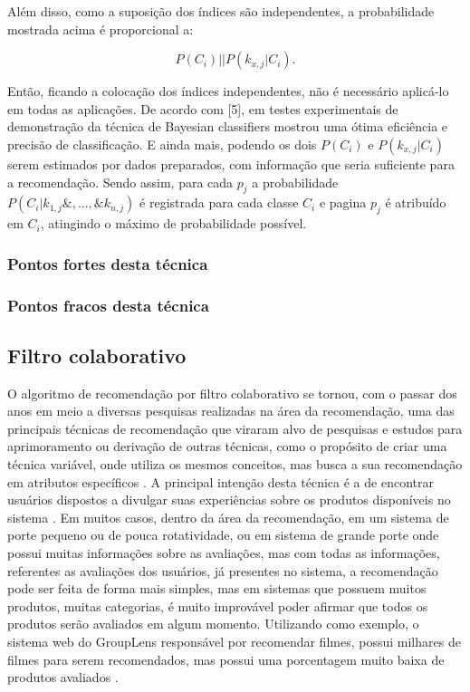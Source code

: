 \documentclass[12pt,
				openright,
				twoside,
				a4paper,
				apter=TITLE,
				section=TITLE,
				subsection=TITLE,
				chapter=TITLE,
				english,
				brazil]{abntex2}
\begin{document}
\begin{equation}
\end{equation}


Além disso, como a suposição dos índices são independentes, a probabilidade mostrada acima é 
proporcional a:

\begin{equation}
P(C_i)||P(k_{x,j}|C_i).
\end{equation}

Então, ficando a colocação dos índices independentes, não é necessário aplicá-lo em todas as aplicações. De acordo com [5], em testes experimentais de demonstração da técnica de Bayesian classifiers mostrou uma ótima eficiência e precisão de classificação. E ainda mais, podendo os dois $P(C_i)$ e $P(k_{x,j}|C_i)$ serem estimados por dados preparados, com informação que seria suficiente para a recomendação. Sendo assim, para cada $p_j$ a probabilidade $P(C_i| k_{1,j}\&,...,\&k_{n,j})$ é registrada para cada classe $C_i$ e pagina $p_j$ é atribuído em $C_i$, atingindo o máximo de probabilidade possível.

\subsubsection{Pontos fortes desta técnica}

\subsubsection{Pontos fracos desta técnica}

\subsection{Filtro colaborativo}
O algoritmo de recomendação por filtro colaborativo se tornou, com o passar dos anos em meio a diversas pesquisas realizadas na área da recomendação, uma das principais técnicas de recomendação que viraram alvo de pesquisas e estudos para aprimoramento ou derivação de outras técnicas, como o propósito de criar uma técnica variável, onde utiliza os mesmos conceitos, mas busca a sua recomendação em atributos específicos \cite{asanov2011algorithms}. A principal intenção desta técnica é a de encontrar usuários dispostos a divulgar suas experiências sobre os produtos disponíveis no sistema \cite{linden2003amazon}. Em muitos casos, dentro da área da recomendação, em um sistema de porte pequeno ou de pouca rotatividade, ou em sistema de grande porte onde possui muitas informações sobre as avaliações, mas com todas as informações, referentes as avaliações dos usuários, já presentes no sistema, a recomendação pode ser feita de forma mais simples, mas em sistemas que possuem muitos produtos, muitas categorias, é muito improvável poder afirmar que todos os produtos serão avaliados em algum momento. Utilizando como exemplo, o sistema web do GroupLens responsável por recomendar filmes, possui milhares de filmes para serem recomendados, mas possui uma porcentagem muito baixa de produtos avaliados \cite{miller2003movielens}. 
\end{document}
